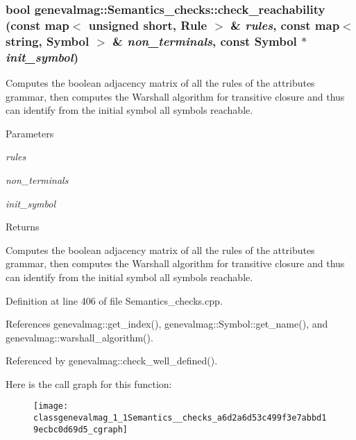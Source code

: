 \hypertarget{classgenevalmag_1_1Semantics__checks_a6d2a6d53c499f3e7abbd19ecbc0d69d5}{
\subsubsection[{check\_\-reachability}]{\setlength{\rightskip}{0pt plus 5cm}bool genevalmag::Semantics\_\-checks::check\_\-reachability (const map$<$ unsigned short, {\bf Rule} $>$ \& {\em rules}, \/  const map$<$ string, {\bf Symbol} $>$ \& {\em non\_\-terminals}, \/  const {\bf Symbol} $\ast$ {\em init\_\-symbol})}}
\label{classgenevalmag_1_1Semantics__checks_a6d2a6d53c499f3e7abbd19ecbc0d69d5}
Computes the boolean adjacency matrix of all the rules of the attributes grammar, then computes the Warshall algorithm for transitive closure and thus can identify from the initial symbol all symbols reachable.


\begin{DoxyParams}{Parameters}
\item[{\em rules}]\item[{\em non\_\-terminals}]\item[{\em init\_\-symbol}]\end{DoxyParams}
\begin{DoxyReturn}{Returns}

\end{DoxyReturn}
Computes the boolean adjacency matrix of all the rules of the attributes grammar, then computes the Warshall algorithm for transitive closure and thus can identify from the initial symbol all symbols reachable. 

Definition at line 406 of file Semantics\_\-checks.cpp.



References genevalmag::get\_\-index(), genevalmag::Symbol::get\_\-name(), and genevalmag::warshall\_\-algorithm().



Referenced by genevalmag::check\_\-well\_\-defined().



Here is the call graph for this function:\nopagebreak
\begin{figure}[H]
\begin{center}
\leavevmode
\texttt{[image: classgenevalmag\_1\_1Semantics\_\_checks\_a6d2a6d53c499f3e7abbd19ecbc0d69d5\_cgraph]}
\end{center}
\end{figure}




